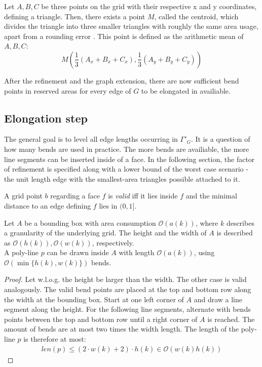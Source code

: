 \begin{fact}\label{fact:centroid-point}
\end{fact}
Let $A,B,C$ be three points on the grid with their respective x and y coordinates, defining a triangle. Then, there exists a point $M$, called the centroid, which divides the triangle into three smaller triangles with roughly the same area usage, apart from a rounding error \cite{Centroid}. This point is defined as the arithmetic mean of $A,B,C$:
$$M\left(\frac{1}{3}(A_x + B_x + C_x), \frac{1}{3}(A_y+B_y+C_y)\right)$$

\bigskip

After the refinement and the graph extension, there are now sufficient bend points in reserved areas for every edge of $G$ to be elongated in availiable.


\subsection{Elongation step}
The general goal is to level all edge lengths occurring in $\Gamma'_G$. It is a question of how many bends are used in practice. The more bends are availiable, the more line segments can be inserted inside of a face. In the following section, the factor of refinement is specified along with a lower bound of the worst case scenario - the unit length edge with the smallest-area triangles possible attached to it.
\begin{fact}
\end{fact}
A grid point $b$ regarding a face $f$ is \textit{valid} iff it lies inside $f$ and the minimal distance to an edge defining $f$ lies in $(0,1]$.
\begin{fact}\label{fact:poly-line-area-length}
\end{fact}
Let $A$ be a bounding box with area consumption $\mathcal{O}(a(k))$, where $k$ describes a granularity of the underlying grid. The height and the width of $A$ is described as $\mathcal{O}(h(k)), \mathcal{O}(w(k))$, respectively.  \\
A poly-line $p$ can be drawn inside $A$ with length $\mathcal{O}(a(k))$, using $\mathcal{O}(\min\{ h(k),w(k) \})$ bends.
\begin{proof}
	Let w.l.o.g. the height be larger than the width. The other case is valid analogously. The valid bend points are placed at the top and bottom row along the width at the bounding box. Start at one left corner of $A$ and draw a line segment along the height. For the following line segments, alternate with bends points between the top and bottom row until a right corner of $A$ is reached. The amount of bends are at most two times the width length. The length of the poly-line $p$ is therefore at most:
	\begin{align*}
		len(p) \leq (2\cdot w(k)+2) \cdot h(k) \in \mathcal{O}(w(k)h(k))
	\end{align*}
\end{proof}

